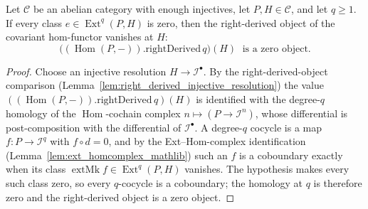 \begin{lemma}
  \label{lem:isZero_coyoneda_rightDerived_of_forall_ext_eq_zero}
  Let \(\mathcal{C}\) be an abelian category with enough injectives, let \(P, H \in \mathcal{C}\), and
  let \(q \geq 1\). If every class \(e \in \operatorname{Ext}^q(P, H)\) is zero, then the right-derived
  object of the covariant hom-functor vanishes at \(H\):
  \[
    \bigl((\operatorname{Hom}(P, -)).\mathrm{rightDerived}\,q\bigr)(H) \;\text{ is a zero object.}
  \]
\end{lemma}
\begin{proof}
  Choose an injective resolution \(H \to \mathcal{I}^\bullet\). By the right-derived-object comparison
  (Lemma~\ref{lem:right_derived_injective_resolution}) the value
  \(((\operatorname{Hom}(P,-)).\mathrm{rightDerived}\,q)(H)\) is identified with the degree-\(q\)
  homology of the \(\operatorname{Hom}\)-cochain complex \(n \mapsto (P \to \mathcal{I}^n)\), whose
  differential is post-composition with the differential of \(\mathcal{I}^\bullet\). A degree-\(q\)
  cocycle is a map \(f : P \to \mathcal{I}^q\) with \(f \circ d = 0\), and by the
  Ext--Hom-complex identification (Lemma~\ref{lem:ext_homcomplex_mathlib}) such an \(f\) is a
  coboundary exactly when its class \(\operatorname{extMk} f \in \operatorname{Ext}^q(P, H)\) vanishes.
  The hypothesis makes every such class zero, so every \(q\)-cocycle is a coboundary; the homology at
  \(q\) is therefore zero and the right-derived object is a zero object.
\end{proof}

